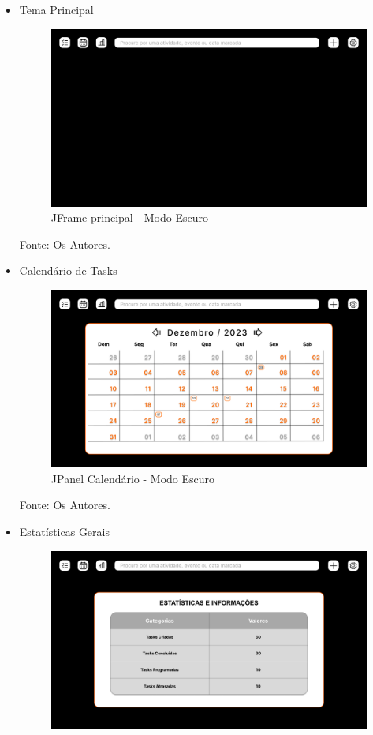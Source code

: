 \documentclass[a4paper,12pt]{article}
\begin{document}
\begin{itemize}
	\item Tema Principal
	\begin{figure}[H]
		\centering
		\includegraphics[scale=0.19]{prototypes/dark/Main Window.png}
		\caption{JFrame principal - Modo Escuro}
	\end{figure}
	\noindent Fonte: Os Autores.
	\item Calendário de Tasks
	\begin{figure}[H]
		\centering
		\includegraphics[scale=0.19]{prototypes/dark/Calendar Panel Window.png}
		\caption{JPanel Calendário - Modo Escuro}
	\end{figure}	
	\noindent Fonte: Os Autores.
	\pagebreak
	\item Estatísticas Gerais
	\begin{figure}[H]
		\centering
		\includegraphics[scale=0.19]{prototypes/dark/Stats Panel Window.png}

\end{figure}
\end{itemize}
\end{document}
